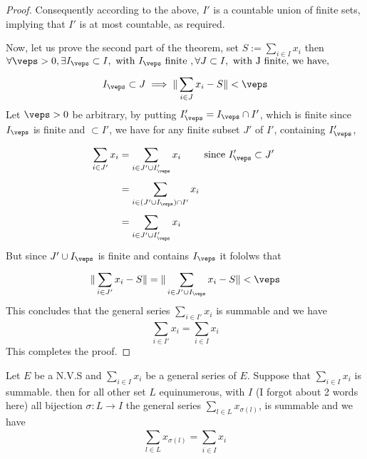 \begin{proof}
Consequently according to the above, 
$I' $  is a countable union of finite sets,
implying that $I' $ is at most countable, 
as required.

Now, let us prove the second part of the theorem,
 set $S := \sum_{i \in  I}^{} x_{i} $  
 then 
 $
 \forall  \veps  >  0, \exists  I_{\veps } \subset I, \text{ with } 
 I_{\veps }   \text{ finite }, \forall J \subset I, 
 \text{ with  J finite, we have, } $ 
 \[
 I_{\veps } \subset J \implies 
 \| \sum_{i \in  J}^{} x_{i} - S \|  <  \veps 
 \]
 Let $\veps  > 0 $ be arbitrary, by putting $I_{\veps }' = 
 I_{\veps } \cap I'$, which is finite since $I_{\veps } $ is finite and 
 $\subset I' $, we have for any finite subset $J' $ of $I' $, containing
 $I_{\veps }' $, 
 \begin{align*}
	 \sum_{i \in  J'}^{} x_{i} &= 
 \sum_{i \in  J' \cup  I_{\veps }'}^{}  x_{i} 
 \quad \quad 
 \text{ since $I_{\veps }' \subset J' $ }   \\
				   &= 
				\sum_{i \in  
				(J' \cup  I_{\veps }) \cap 
			I'}^{}  
		x_{i}  \\
				   &= \sum_{
				   i \in  J' \cup  I_{\veps }'}^{}  
				   x_{i}
 \end{align*}
 But since $J' \cup  I_{\veps } $  
 is finite and contains $I_{\veps } $  it fololws that 
 \[
 \|  \sum_{i \in  J'}^{} x_{i} - S \|  = 
 \| \sum_{i \in J' \cup  I_{\veps }}^{} x_{i} -S \|  <  \veps 
 \]
 This concludes that 
 the general series 
 $\sum_{ i \in  I'}^{} x_{i}  $  is summable and we have 
 \[
 \sum_{ i  \in I'}^{}  x_{i} = 
 \sum_{i \in  I}^{}  x_{i}
 \]
 This completes the proof.
\end{proof}
\divider
\begin{theorem}[]
Let $E $ be a N.V.S 
and $\sum_{ i \in I}^{} x_{i}  $  be 
a general series of $E $. Suppose that 
$\sum_{i \in  I}^{}  x_{i} $  is summable.
then for all other set $L $ equinumerous, with $I$  (I forgot about 2 words here)
all bijection 
$ \sigma    :  L \longrightarrow  I$ 
the general series
$\sum_{l \in  L}^{} x_{\sigma (l)   } $, is summable
and we have 
\[
\sum_{l \in  L}^{} x_{\sigma (l)   } 
= \sum_{i \in I}^{}  x_{i}
\]
\end{theorem}

